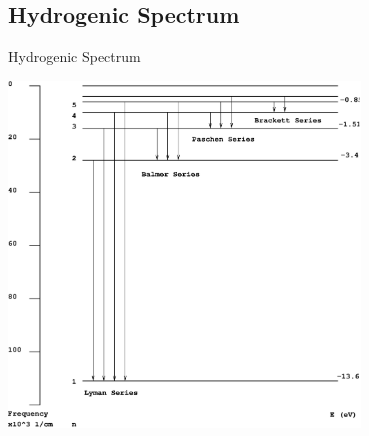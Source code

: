 \documentclass[xcolor=dvipsnames,t]{beamer}
\begin{document}
    \subsection{Hydrogenic Spectrum}
    \begin{frame}{Hydrogenic Spectrum} 

        \centering
        \includegraphics[width=0.7\textwidth]{spectrum}
    \end{frame} 
\end{document}
